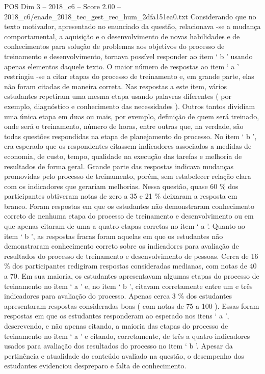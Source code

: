 \begin{textsample}{POS Dim 3 – 2018\_c6 – Score 2.00 – 2018\_c6/enade\_2018\_tec\_gest\_rec\_hum\_2dfa151ea0.txt}
Considerando que no texto motivador, apresentado no enunciado da questão, relacionava -se a mudança comportamental, a aquisição e o desenvolvimento de novas habilidades e de conhecimentos para solução de problemas aos objetivos do processo de treinamento e desenvolvimento, tornava possível responder ao item ‘ b ’ usando apenas elementos daquele texto.
O maior número de respostas ao item ‘ a ’ restringiu -se a citar etapas do processo de treinamento e, em grande parte, elas não foram citadas de maneira correta.
Nas respostas a este item, vários estudantes repetiram uma mesma etapa usando palavras diferentes ( por exemplo, diagnóstico e conhecimento das necessidades ).
Outros tantos dividiam uma única etapa em duas ou mais, por exemplo, definição de quem será treinado, onde será o treinamento, número de horas, entre outras que, na verdade, são todas questões respondidas na etapa de planejamento do processo.
No item ‘ b ’, era esperado que os respondentes citassem indicadores associados a medidas de economia, de custo, tempo, qualidade na execução das tarefas e melhoria de resultados de forma geral.
Grande parte das respostas indicava mudanças promovidas pelo processo de treinamento, porém, sem estabelecer relação clara com os indicadores que gerariam melhorias.
Nessa questão, quase 60 \% dos participantes obtiveram notas de zero a 35 e 21 \% deixaram a resposta em branco.
Foram respostas em que os estudantes não demonstraram conhecimento correto de nenhuma etapa do processo de treinamento e desenvolvimento ou em que apenas citaram de uma a quatro etapas corretas no item ‘ a ’.
Quanto ao item ‘ b ’, as respostas fracas foram aquelas em que os estudantes não demonstraram conhecimento correto sobre os indicadores para avaliação de resultados do processo de treinamento e desenvolvimento de pessoas.
Cerca de 16 \% dos participantes redigiram respostas consideradas medianas, com notas de 40 a 70.
Em sua maioria, os estudantes apresentavam algumas etapas do processo de treinamento no item ‘ a ’ e, no item ‘ b ’, citavam corretamente entre um e três indicadores para avaliação do processo.
Apenas cerca 3 \% dos estudantes apresentaram respostas consideradas boas ( com notas de 75 a 100 ).
Essas foram respostas em que os estudantes responderam ao esperado nos itens ‘ a ’, descrevendo, e não apenas citando, a maioria das etapas do processo de treinamento no item ‘ a ’ e citando, corretamente, de três a quatro indicadores usados para avaliação dos resultados do processo no item ‘ b ’.
Apesar da pertinência e atualidade do conteúdo avaliado na questão, o desempenho dos estudantes evidenciou despreparo e falta de conhecimento.

\end{textsample}
